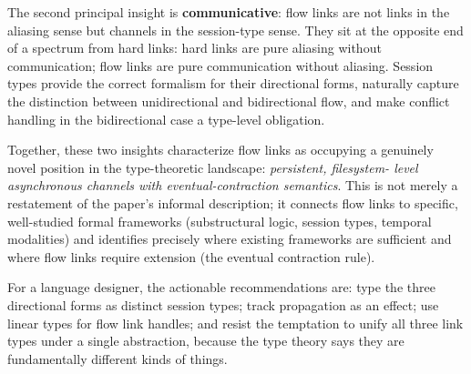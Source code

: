 \documentclass[11pt]{article}
\begin{document}
The second principal insight is \textbf{communicative}: flow links are not
links in the aliasing sense but channels in the session-type sense. They sit
at the opposite end of a spectrum from hard links: hard links are pure
aliasing without communication; flow links are pure communication without
aliasing. Session types provide the correct formalism for their directional
forms, naturally capture the distinction between unidirectional and
bidirectional flow, and make conflict handling in the bidirectional case a
type-level obligation.

Together, these two insights characterize flow links as occupying a genuinely
novel position in the type-theoretic landscape: \emph{persistent, filesystem-
level asynchronous channels with eventual-contraction semantics}. This is not
merely a restatement of the paper's informal description; it connects flow
links to specific, well-studied formal frameworks (substructural logic, session
types, temporal modalities) and identifies precisely where existing frameworks
are sufficient and where flow links require extension (the eventual contraction
rule).

For a language designer, the actionable recommendations are: type the three
directional forms as distinct session types; track propagation as an effect;
use linear types for flow link handles; and resist the temptation to unify all
three link types under a single abstraction, because the type theory says they
are fundamentally different kinds of things.
\end{document}
